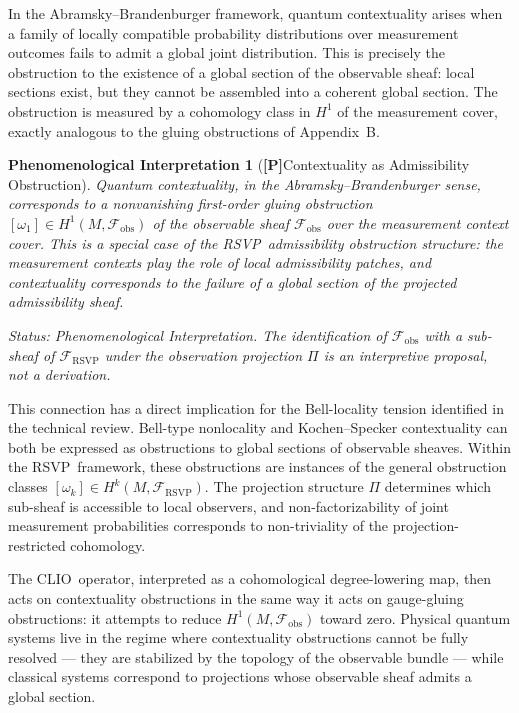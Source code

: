 \documentclass[12pt,a4paper]{article}
\newcommand{\claimP}{\textbf{[P]}\;}
\newtheorem{appphen}[defn]{Phenomenological Interpretation}
\newcommand{\RSVP}{\textrm{RSVP}}
\newcommand{\CLIO}{\textrm{CLIO}}
\newcommand{\Sheaf}{\mathcal{F}}
\begin{document}
In the Abramsky--Brandenburger framework, quantum contextuality arises when
a family of locally compatible probability distributions over measurement
outcomes fails to admit a global joint distribution. This is precisely the
obstruction to the existence of a global section of the observable sheaf:
local sections exist, but they cannot be assembled into a coherent global
section. The obstruction is measured by a cohomology class in $H^1$ of the
measurement cover, exactly analogous to the gluing obstructions of
Appendix~B.

\begin{appphen}[\claimP Contextuality as Admissibility Obstruction]
Quantum contextuality, in the Abramsky--Brandenburger sense, corresponds to a
nonvanishing first-order gluing obstruction $[\omega_1]\in H^1(M,\Sheaf_\mathrm{obs})$
of the observable sheaf $\Sheaf_\mathrm{obs}$ over the measurement context cover.
This is a special case of the \RSVP\ admissibility obstruction structure: the
measurement contexts play the role of local admissibility patches, and
contextuality corresponds to the failure of a global section of the projected
admissibility sheaf.

\emph{Status: Phenomenological Interpretation.} The identification of
$\Sheaf_\mathrm{obs}$ with a sub-sheaf of $\Sheaf_\RSVP$ under the observation
projection $\Pi$ is an interpretive proposal, not a derivation.
\end{appphen}

This connection has a direct implication for the Bell-locality tension
identified in the technical review. Bell-type nonlocality and Kochen--Specker
contextuality can both be expressed as obstructions to global sections of
observable sheaves. Within the \RSVP\ framework, these obstructions are
instances of the general obstruction classes $[\omega_k]\in H^k(M,\Sheaf_\RSVP)$.
The projection structure $\Pi$ determines which sub-sheaf is accessible to
local observers, and non-factorizability of joint measurement probabilities
corresponds to non-triviality of the projection-restricted cohomology.

The \CLIO\ operator, interpreted as a cohomological degree-lowering map, then
acts on contextuality obstructions in the same way it acts on gauge-gluing
obstructions: it attempts to reduce $H^1(M,\Sheaf_\mathrm{obs})$ toward zero.
Physical quantum systems live in the regime where contextuality obstructions
cannot be fully resolved --- they are stabilized by the topology of the
observable bundle --- while classical systems correspond to projections whose
observable sheaf admits a global section.
\end{document}
